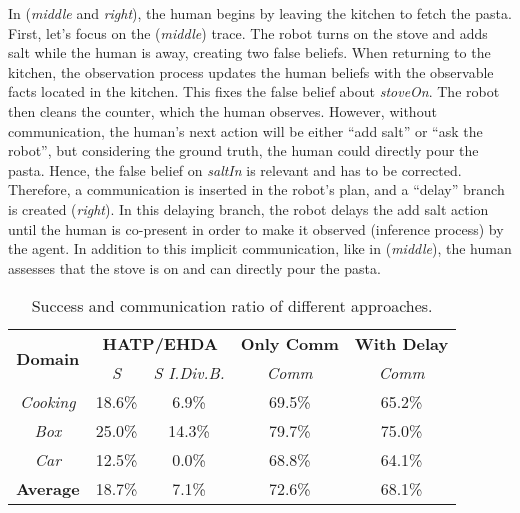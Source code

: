 {In (\textit{middle} and \textit{right}), the human begins by leaving the kitchen to fetch the pasta. First, let's focus on the (\textit{middle}) trace. The robot turns on the stove and adds salt while the human is away, creating two false beliefs. When returning to the kitchen, the observation process updates the human beliefs with the observable facts located in the kitchen. This fixes the false belief about \textit{stoveOn}. The robot then cleans the counter, which the human observes. 
However, without communication, the human's next action will be either ``add salt'' or ``ask the robot'', but considering the ground truth, the human could directly pour the pasta. Hence, the false belief on \textit{saltIn} is relevant and has to be corrected. Therefore, a communication is inserted in the robot's plan, and a ``delay'' branch is created (\textit{right}). 
In this delaying branch, the robot delays the add salt action until the human is co-present in order to make it observed (inference process) by the agent. 
In addition to this implicit communication, like in (\textit{middle}), the human assesses that the stove is on and can directly pour the pasta. 
\begin{table}[t]
    \centering
    \vspace{0.1cm}
    \caption
    {
    Success and communication ratio of different approaches. 
    }
    \label{tab:q_results}
    \begin{tabular}{@{}c|c c|| c| c@{}}
        \multirow{2}{*}{\textbf{Domain}} & \multicolumn{2}{c||}{\textbf{HATP/EHDA}} & \multicolumn{1}{c|}{\textbf{Only Comm}} & \multicolumn{1}{c}{\textbf{With Delay}}
        \\
        & \multicolumn{1}{c}{\textit{S}} & \multicolumn{1}{c||}{\textit{S I.Div.B.}} & \multicolumn{1}{c|}{\textit{Comm}} & \multicolumn{1}{c}{\textit{Comm}} 
        \\ \cline{1-5}
        \textit{Cooking}    &   18.6\%  &  6.9\%    & 69.5\% & 65.2\%\\
        \textit{Box}        &   25.0\%  & 14.3\%    & 79.7\% & 75.0\%\\
        \textit{Car}        &   12.5\%  & 0.0\%     & 68.8\% & 64.1\%\\
        \hline
        \textbf{Average}    &   18.7\%  & 7.1\%     & 72.6\% & 68.1\%\\
    \end{tabular}
\end{table}

}
